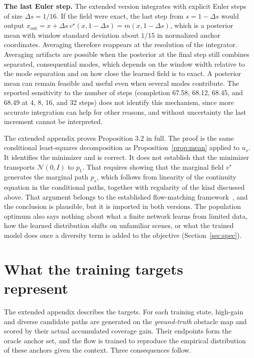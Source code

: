 \documentclass[11pt]{article}
\theoremstyle{plain}
\theoremstyle{remark}
\begin{document}
\textbf{The last Euler step.} The extended version integrates with explicit Euler steps of size $\Delta s=1/16$. If the field were exact, the last step from $s=1-\Delta s$ would output $x_{\mathrm{out}}=x+\Delta s\,v^\star(x,1-\Delta s)=m(x,1-\Delta s)$, which is a posterior mean with window standard deviation about $1/15$ in normalized anchor coordinates. Averaging therefore reappears at the resolution of the integrator. Averaging artifacts are possible when the posterior at the final step still combines separated, consequential modes, which depends on the window width relative to the mode separation and on how close the learned field is to exact. A posterior mean can remain feasible and useful even when several modes contribute. The reported sensitivity to the number of steps (completion 67.58, 68.12, 68.45, and 68.49 at 4, 8, 16, and 32 steps) does not identify this mechanism, since more accurate integration can help for other reasons, and without uncertainty the last increment cannot be interpreted.

The extended appendix proves Proposition 3.2 in full. The proof is the same conditional least-squares decomposition as Proposition~\ref{prop:mean} applied to $u_s$. It identifies the minimizer and is correct. It does not establish that the minimizer transports $\mathcal N(0,I)$ to $p_1$. That requires showing that the marginal field $v^\star$ generates the marginal path $p_s$, which follows from linearity of the continuity equation in the conditional paths, together with regularity of the kind discussed above. That argument belongs to the established flow-matching framework~\cite{lipman2023flow}, and the conclusion is plausible, but it is imported in both versions. The population optimum also says nothing about what a finite network learns from limited data, how the learned distribution shifts on unfamiliar scenes, or what the trained model does once a diversity term is added to the objective (Section~\ref{sec:spec}).

\section{What the training targets represent}\label{sec:targets}

The extended appendix describes the targets. For each training state, high-gain and diverse candidate paths are generated on the \emph{ground-truth} obstacle map and scored by their actual accumulated coverage gain. Their endpoints form the oracle anchor set, and the flow is trained to reproduce the empirical distribution of these anchors given the context. Three consequences follow.
\end{document}
